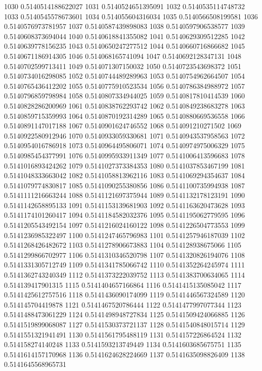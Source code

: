 1030 0.5140514188622027
1031 0.5140524651395091
1032 0.5140535114748732
1033 0.5140545578673601
1034 0.514055604316034
1035 0.5140566508199581
1036 0.5140576973781957
1037 0.5140587439898083
1038 0.5140597906538577
1039 0.5140608373694044
1040 0.5140618841355082
1041 0.5140629309512285
1042 0.5140639778156235
1043 0.5140650247277512
1044 0.5140660716866682
1045 0.5140671186914305
1046 0.514068165741094
1047 0.5140692128347131
1048 0.5140702599713411
1049 0.514071307150032
1050 0.5140723543698372
1051 0.5140734016298085
1052 0.5140744489289963
1053 0.5140754962664507
1054 0.5140765436412202
1055 0.5140775910523534
1056 0.5140786384988972
1057 0.5140796859798984
1058 0.5140807334944025
1059 0.5140817810414539
1060 0.5140828286200969
1061 0.5140838762293742
1062 0.5140849238683278
1063 0.5140859715359993
1064 0.5140870192314289
1065 0.5140880669536558
1066 0.5140891147017188
1067 0.5140901624746552
1068 0.514091210271502
1069 0.5140922580912946
1070 0.5140933059330681
1071 0.5140943537958563
1072 0.5140954016786918
1073 0.5140964495806071
1074 0.5140974975006329
1075 0.5140985454377991
1076 0.5140995933911349
1077 0.5141006413596683
1078 0.5141016893424262
1079 0.5141027373384353
1080 0.5141037853467199
1081 0.5141048333663042
1082 0.5141058813962116
1083 0.5141069294354637
1084 0.5141079774830817
1085 0.5141090255380856
1086 0.5141100735994938
1087 0.5141111216663244
1088 0.5141121697375944
1089 0.5141132178123191
1090 0.5141142658895133
1091 0.5141153139681903
1092 0.5141163620473628
1093 0.5141174101260417
1094 0.5141184582032376
1095 0.5141195062779595
1096 0.5141205543492154
1097 0.5141216024160122
1098 0.5141226504773553
1099 0.5141236985322497
1100 0.5141247465796983
1101 0.5141257946187039
1102 0.5141268426482672
1103 0.5141278906673883
1104 0.514128938675066
1105 0.5141299866702977
1106 0.5141310346520798
1107 0.5141320826194076
1108 0.5141331305712749
1109 0.5141341785066742
1110 0.5141352264245974
1111 0.5141362743240349
1112 0.5141373222039752
1113 0.5141383700634065
1114 0.514139417901315
1115 0.5141404657166864
1116 0.5141415135085042
1117 0.5141425612757516
1118 0.5141436090174099
1119 0.5141446567324589
1120 0.514145704419878
1121 0.5141467520786444
1122 0.5141477997077344
1123 0.5141488473061229
1124 0.5141498948727834
1125 0.5141509424066885
1126 0.5141519899068087
1127 0.5141530373721137
1128 0.5141540848015714
1129 0.5141551321941491
1130 0.5141561795488119
1131 0.514157226864524
1132 0.514158274140248
1133 0.5141593213749449
1134 0.5141603685675751
1135 0.5141614157170968
1136 0.5141624628224669
1137 0.5141635098826409
1138 0.5141645568965731
